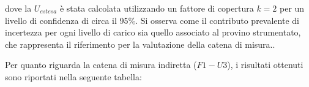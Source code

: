 \documentclass[a4paper, twoside]{article}
\begin{document}
\begin{table}[H]
    \centering
    \renewcommand{\arraystretch}{1.3}
    \caption{Componenti di incertezza e incertezza estesa per la catena di misura diretta sul banco prova STBF 2}
    \label{tab:incertezze_stbf_diretta}
\end{table}

dove la $U_{estesa}$ è stata calcolata utilizzando un fattore di copertura $k=2$ per un livello di confidenza di circa il 95\%. Si osserva come il contributo prevalente di incertezza per ogni livello di carico sia quello associato al provino strumentato, che rappresenta il riferimento per la valutazione della catena di misura..


Per quanto riguarda la catena di misura indiretta ($F1-U3$), i risultati ottenuti sono riportati nella seguente tabella:
\end{document}
